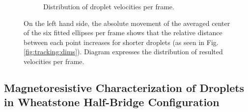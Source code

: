 \begin{figure}
\begin{subfigure}[r]{0.49\textwidth}
	\caption{Distribution of droplet velocities per frame.}
	\label{fig:tracking:velocity}
\end{subfigure}
\caption{On the left hand side, the absolute movement of the averaged center of the six fitted ellipses per frame shows that the relative distance between each point increases for shorter droplets (as seen in Fig. \ref{fig:tracking:dims}). Diagram 	\protect{} expresses the distribution of resulted velocities per frame.}
\label{fig:tracking:movement}
\end{figure}
\newpage


\subsection{Magnetoresistive Characterization of Droplets in Wheatstone Half-Bridge Configuration}

